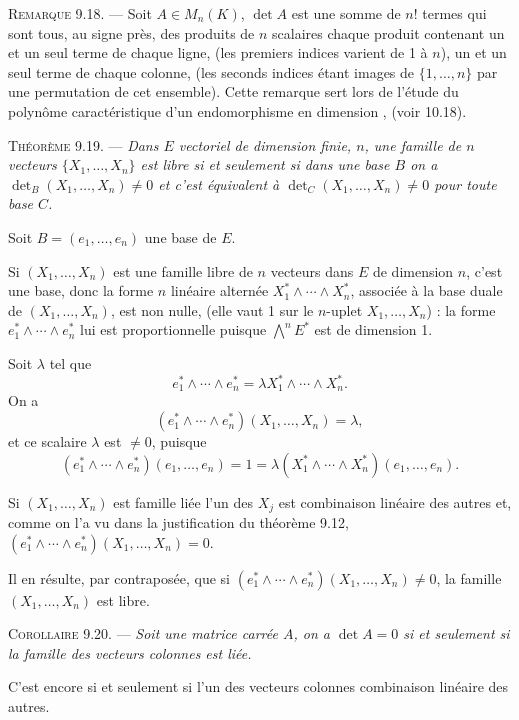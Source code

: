 \medskip\noindent\textsc{Remarque 9.18.} --- Soit $A\in M_n(K)$, $\det A$ est une somme de $n!$ termes qui sont tous, au signe près, des produits de $n$ scalaires chaque produit contenant un et un seul terme de chaque ligne, (les premiers indices varient de 1 à $n$), un et un seul terme de chaque colonne, (les seconds indices étant images de $\{1,\ldots,n\}$ par une permutation de cet ensemble). Cette remarque sert lors de l'étude du polynôme caractéristique d'un endomorphisme en dimension , (voir 10.18).

\medskip\noindent\textsc{Théorème 9.19.} --- \emph{Dans $E$ vectoriel de dimension finie, $n$, une famille de $n$ vecteurs $\{X_1,\ldots,X_n\}$ est libre si et seulement si dans une base $B$ on a $\det_B(X_1,\ldots,X_n)\ne0$ et c'est équivalent à $\det_C(X_1,\ldots,X_n)\ne0$ pour toute base $C$.}

Soit $B=(e_1,\ldots,e_n)$ une base de $E$.

Si $(X_1,\ldots,X_n)$ est une famille libre de $n$ vecteurs dans $E$ de dimension $n$, c'est une base, donc la forme $n$ linéaire alternée $X_1^*\wedge\cdots\wedge X_n^*$, associée à la base duale de $(X_1,\ldots,X_n)$, est non nulle, (elle vaut 1 sur le $n$-uplet $X_1,\ldots,X_n$) : la forme $e_1^*\wedge\cdots\wedge e_n^*$ lui est proportionnelle puisque $\bigwedge^nE^*$ est de dimension 1.

Soit $\lambda$ tel que
\[
e_1^*\wedge\cdots\wedge e_n^*=\lambda X_1^*\wedge\cdots\wedge X_n^*.
\]
On a
\[
(e_1^*\wedge\cdots\wedge e_n^*)(X_1,\ldots,X_n)=\lambda,
\]
et ce scalaire $\lambda$ est $\ne0$, puisque
\[
(e_1^*\wedge\cdots\wedge e_n^*)(e_1,\ldots,e_n)=1=
\lambda(X_1^*\wedge\cdots\wedge X_n^*)(e_1,\ldots,e_n).
\]

Si $(X_1,\ldots,X_n)$ est famille liée l'un des $X_j$ est combinaison linéaire des autres et, comme on l'a vu dans la justification du théorème 9.12, $(e_1^*\wedge\cdots\wedge e_n^*)(X_1,\ldots,X_n)=0$.

Il en résulte, par contraposée, que si $(e_1^*\wedge\cdots\wedge e_n^*)(X_1,\ldots,X_n)\ne0$, la famille $(X_1,\ldots,X_n)$ est libre. \bookend

\medskip\noindent\textsc{Corollaire 9.20.} --- \emph{Soit une matrice carrée $A$, on a $\det A=0$ si et seulement si la famille des vecteurs colonnes est liée.}

C'est encore si et seulement si l'un des vecteurs colonnes  combinaison linéaire des autres. \bookend

